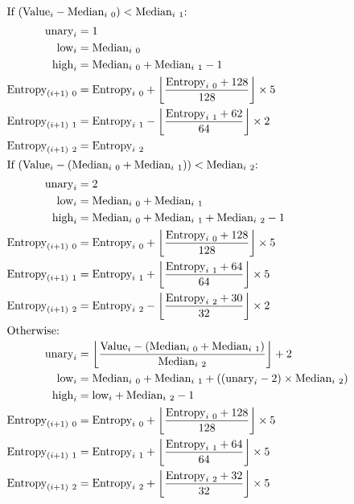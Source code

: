 \begin{align*}
\intertext{If $(\text{Value}_i - \text{Median}_{i~0}) < \text{Median}_{i~1}$:}
\text{unary}_i &= 1 \\
\text{low}_i &= \text{Median}_{i~0} \\
\text{high}_i &= \text{Median}_{i~0} + \text{Median}_{i~1} - 1 \\
\text{Entropy}_{(i + 1)~0} &= \text{Entropy}_{i~0} + \left\lfloor\frac{\text{Entropy}_{i~0} + 128}{128}\right\rfloor \times 5 \\
\text{Entropy}_{(i + 1)~1} &= \text{Entropy}_{i~1} - \left\lfloor\frac{\text{Entropy}_{i~1} + 62}{64}\right\rfloor \times 2\\
\text{Entropy}_{(i + 1)~2} &= \text{Entropy}_{i~2} \\
\intertext{If $(\text{Value}_i - (\text{Median}_{i~0} + \text{Median}_{i~1})) < \text{Median}_{i~2}$:}
\text{unary}_i &= 2 \\
\text{low}_i &= \text{Median}_{i~0} + \text{Median}_{i~1} \\
\text{high}_i &= \text{Median}_{i~0} + \text{Median}_{i~1} + \text{Median}_{i~2} - 1 \\
\text{Entropy}_{(i + 1)~0} &= \text{Entropy}_{i~0} + \left\lfloor\frac{\text{Entropy}_{i~0} + 128}{128}\right\rfloor \times 5 \\
\text{Entropy}_{(i + 1)~1} &= \text{Entropy}_{i~1} + \left\lfloor\frac{\text{Entropy}_{i~1} + 64}{64}\right\rfloor \times 5 \\
\text{Entropy}_{(i + 1)~2} &= \text{Entropy}_{i~2} - \left\lfloor\frac{\text{Entropy}_{i~2} + 30}{32}\right\rfloor \times 2 \\
\intertext{Otherwise:}
\text{unary}_i &= \left\lfloor\frac{\text{Value}_i - (\text{Median}_{i~0} + \text{Median}_{i~1})}{\text{Median}_{i~2}}\right\rfloor + 2 \\
\text{low}_i &= \text{Median}_{i~0} + \text{Median}_{i~1} + ((\text{unary}_i - 2) \times \text{Median}_{i~2}) \\
\text{high}_i &= \text{low}_i + \text{Median}_{i~2} - 1 \\
\text{Entropy}_{(i + 1)~0} &= \text{Entropy}_{i~0} + \left\lfloor\frac{\text{Entropy}_{i~0} + 128}{128}\right\rfloor \times 5 \\
\text{Entropy}_{(i + 1)~1} &= \text{Entropy}_{i~1} + \left\lfloor\frac{\text{Entropy}_{i~1} + 64}{64}\right\rfloor \times 5 \\
\text{Entropy}_{(i + 1)~2} &= \text{Entropy}_{i~2} + \left\lfloor\frac{\text{Entropy}_{i~2} + 32}{32}\right\rfloor \times 5
\end{align*}

